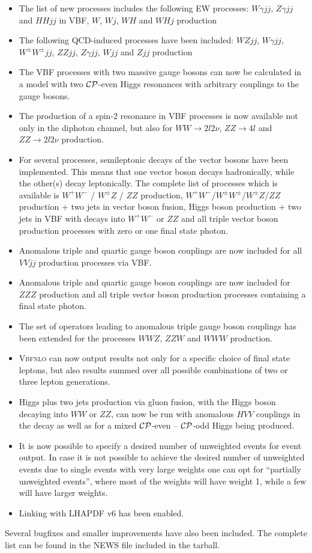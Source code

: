 \documentclass[english,12pt]{article}
\begin{document}
\begin{itemize}
 \item The list of new processes includes the following EW processes: $W\gamma jj$, $Z\gamma jj$ and $HHjj$ in VBF, $W$, $Wj$, $WH$ and $WHj$ production
 \item The following QCD-induced processes have been included: $WZjj$, $W\gamma jj$, $W^\pm W^\pm jj$, $ZZjj$, $Z\gamma jj$, $Wjj$ and $Zjj$ production
 \item The VBF processes with two massive gauge bosons can now be
       calculated in a model with two $\cal{CP}$-even Higgs resonances
       with arbitrary couplings to the gauge bosons.
 \item The production of a spin-2 resonance in VBF processes is now available not only in the 
       diphoton channel, but also for $WW \to 2l 2 \nu$, $ZZ \to 4l$ and $ZZ \to 2l 2 \nu$ production.
 \item For several processes, semileptonic decays of the vector bosons have been implemented.
       This means that one vector boson decays hadronically, while the other(s) decay leptonically.
       The complete list of processes which is available is $W^+W^-$ / $W^\pm Z$ / $ZZ$ production,
       $W^+W^-$/$W^\pm W^\pm$/$W^\pm Z$/$ZZ$ production + two jets in vector boson fusion, Higgs boson production + two jets in VBF
       with decays into $W^+W^-$ or $ZZ$ and all triple vector boson production processes with zero or one final state photon.
 \item Anomalous triple and quartic gauge boson couplings are now
       included for all $VVjj$ production processes via VBF.
 \item Anomalous triple and quartic gauge boson couplings are now included for $ZZZ$ production and all triple vector boson production processes
       containing a final state photon.
 \item The set of operators leading to anomalous triple gauge boson couplings has been extended for the processes
       $WWZ$, $ZZW$ and $WWW$ production.
 \item \textsc{Vbfnlo} can now output results not only for a specific choice of final state leptons, but also results summed over
       all possible combinations of two or three lepton generations.
 \item Higgs plus two jets production via gluon fusion, with the Higgs boson decaying into $WW$ or $ZZ$, 
       can now be run with anomalous $HVV$ couplings in the decay as
       well as for a mixed $\cal{CP}$-even -- $\cal{CP}$-odd Higgs being produced.
 \item It is now possible to specify a desired number of unweighted events for event output.
       In case it is not possible to achieve the desired number of unweighted
       events due to single events with very large weights one can
       opt for ``partially unweighted events'', where most of the weights will have
       weight 1, while a few will have larger weights.
 \item Linking with LHAPDF v6 has been enabled.
\end{itemize}
Several bugfixes and smaller improvements have also been included. The
complete list can be found in the NEWS file included in the tarball.
\end{document}
